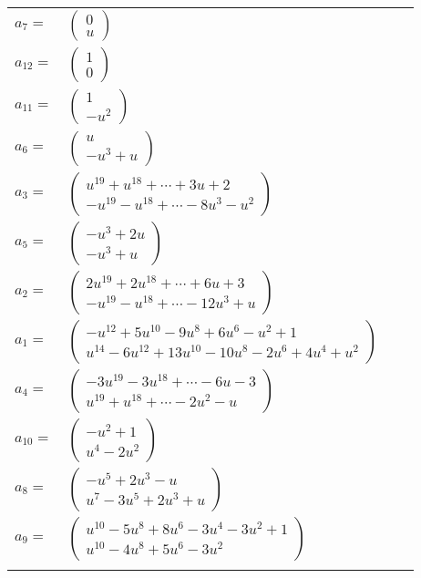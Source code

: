 \documentclass[1p]{elsarticle_modified}
\theoremstyle{definition}
\begin{document}
\begin{tabular}{m{7pt} m{180pt} m{7pt} m{180pt} }
\flushright $a_{7}=$&$\begin{pmatrix}0\\u\end{pmatrix}$ \\
\flushright $a_{12}=$&$\begin{pmatrix}1\\0\end{pmatrix}$ \\
\flushright $a_{11}=$&$\begin{pmatrix}1\\- u^2\end{pmatrix}$ \\
\flushright $a_{6}=$&$\begin{pmatrix}u\\- u^3+u\end{pmatrix}$ \\
\flushright $a_{3}=$&$\begin{pmatrix}u^{19}+u^{18}+\cdots+3 u+2\\- u^{19}- u^{18}+\cdots-8 u^3- u^2\end{pmatrix}$ \\
\flushright $a_{5}=$&$\begin{pmatrix}- u^3+2 u\\- u^3+u\end{pmatrix}$ \\
\flushright $a_{2}=$&$\begin{pmatrix}2 u^{19}+2 u^{18}+\cdots+6 u+3\\- u^{19}- u^{18}+\cdots-12 u^3+u\end{pmatrix}$ \\
\flushright $a_{1}=$&$\begin{pmatrix}- u^{12}+5 u^{10}-9 u^8+6 u^6- u^2+1\\u^{14}-6 u^{12}+13 u^{10}-10 u^8-2 u^6+4 u^4+u^2\end{pmatrix}$ \\
\flushright $a_{4}=$&$\begin{pmatrix}-3 u^{19}-3 u^{18}+\cdots-6 u-3\\u^{19}+u^{18}+\cdots-2 u^2- u\end{pmatrix}$ \\
\flushright $a_{10}=$&$\begin{pmatrix}- u^2+1\\u^4-2 u^2\end{pmatrix}$ \\
\flushright $a_{8}=$&$\begin{pmatrix}- u^5+2 u^3- u\\u^7-3 u^5+2 u^3+u\end{pmatrix}$ \\
\flushright $a_{9}=$&$\begin{pmatrix}u^{10}-5 u^8+8 u^6-3 u^4-3 u^2+1\\u^{10}-4 u^8+5 u^6-3 u^2\end{pmatrix}$\\&\end{tabular}
\end{document}

